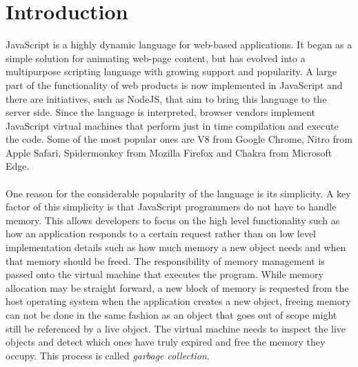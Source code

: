 \documentclass{l4proj}
\begin{document}
\section{Introduction}
\hspace*{3em} JavaScript is a highly dynamic language for web-based applications.\cite{intro} 
It began as a simple solution for animating web-page content, but has evolved into a multipurpose scripting language with growing support and popularity. A large part of the functionality of web products is now implemented in JavaScript and there are initiatives, such as NodeJS\cite{nodejs}, that aim to bring this language to the server side. Since the language is interpreted, browser vendors implement JavaScript virtual machines that perform just in time compilation and execute the code. Some of the most popular ones are V8 from Google Chrome\cite{v8}, Nitro from Apple Safari, Spidermonkey\cite{spidermk} from Mozilla Firefox and Chakra\cite{chakra} from Microsoft Edge.
\\\\%
\hspace*{3em} One reason for the considerable popularity of the language is its simplicity. A key factor of this simplicity is that JavaScript programmers do not have to handle memory. This allows developers to focus on the high level functionality such as how an application responds to a certain request rather than on low level implementation details such as how much memory a new object needs and when that memory should be freed. The responsibility of memory management is passed onto the virtual machine that executes the program. While memory allocation may be straight forward, a new block of memory is requested from the host operating system when the application creates a new object, freeing memory can not be done in the same fashion as an object that goes out of scope might still be referenced by a live object. The virtual machine needs to inspect the live objects and detect which ones have truly expired and free the memory they occupy. This process is called \textit{garbage collection}.
\\\\%
\end{document}
